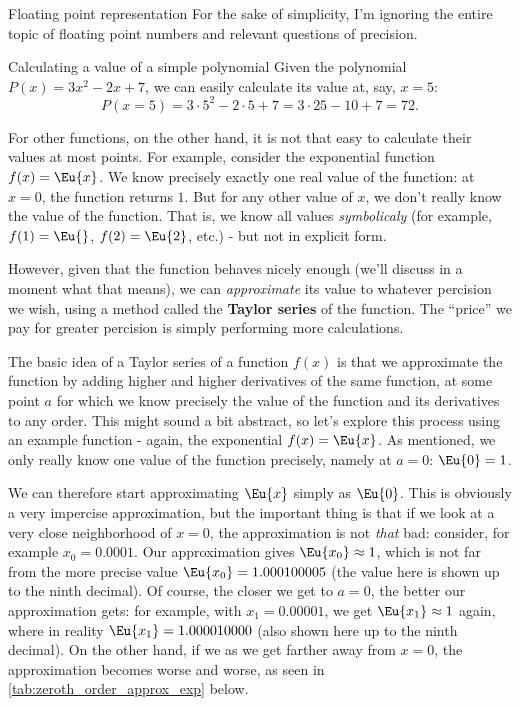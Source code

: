 \begin{note}{Floating point representation}{}
	For the sake of simplicity, I'm ignoring the entire topic of floating point numbers and relevant questions of precision.
\end{note}

\begin{example}{Calculating a value of a simple polynomial}{}
	Given the polynomial $P(x)=3x^{2}-2x+7$, we can easily calculate its value at, say, $x=5$:
	\[
		P(x=5) = 3\cdot5^{2}-2\cdot5+7 = 3\cdot25-10+7 = 72.
	\]
\end{example}

For other functions, on the other hand, it is not that easy to calculate their values at most points. For example, consider the exponential function $f(x)=\Eu{x}$. We know precisely exactly one real value of the function: at $x=0$, the function returns $1$. But for any other value of $x$, we don't really know the value of the function. That is, we know all values \textit{symbolicaly} (for example, $f(1)=\Eu{}$, $f(2)=\Eu{2}$, etc.) - but not in explicit form.

However, given that the function behaves nicely enough (we'll discuss in a moment what that means), we can \textit{approximate} its value to whatever percision we wish, using a method called the \textbf{Taylor series} of the function. The \enquote{price} we pay for greater percision is simply performing more calculations.

The basic idea of a Taylor series of a function $f(x)$ is that we approximate the function by adding higher and higher derivatives of the same function, at some point $a$ for which we know precisely the value of the function and its derivatives to any order. This might sound a bit abstract, so let's explore this process using an example function - again, the exponential $f(x)=\Eu{x}$. As mentioned, we only really know one value of the function precisely, namely at $a=0$: $\Eu{0}=1$.

We can therefore start approximating $\Eu{x}$ simply as $\Eu{0}$. This is obviously a very impercise approximation, but the important thing is that if we look at a very close neighborhood of $x=0$, the approximation is not \textit{that} bad: consider, for example $x_{0}=0.0001$. Our approximation gives $\Eu{x_{0}}\approx1$, which is not far from the more precise value $\Eu{x_{0}}=1.000100005$ (the value here is shown up to the ninth decimal). Of course, the closer we get to $a=0$, the better our approximation gets: for example, with $x_{1}=0.00001$, we get $\Eu{x_{1}}\approx1$ again, where in reality $\Eu{x_{1}}=1.000010000$ (also shown here up to the ninth decimal). On the other hand, if we as we get farther away from $x=0$, the approximation becomes worse and worse, as seen in \autoref{tab:zeroth_order_approx_exp} below.

